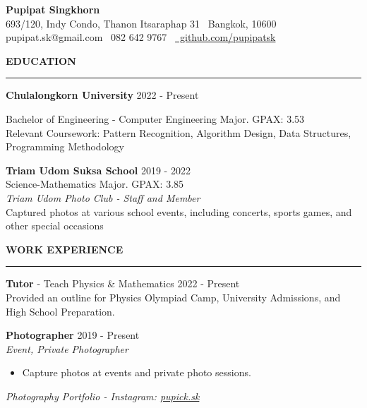 \documentclass[11pt]{article}
\begin{document}
\begin{center}
    {\Large \textbf{Pupipat Singkhorn}}\\
    693/120, Indy Condo, Thanon Itsaraphap 31 \textbullet \ Bangkok, 10600 \\
    pupipat.sk@gmail.com \textbullet \ 082 642 9767 \textbullet\ \href{https://github.com/pupipatsk}{\faGithub\ github.com/pupipatsk}
\end{center}

\textbf{EDUCATION}
\vspace{5pt}
{\color{NavyBlue}\hrule}
\vspace{9pt}
\textbf{Chulalongkorn University} \hfill 2022 - Present

\hspace*{7pt} Bachelor of Engineering - Computer Engineering Major. GPAX: 3.53\\
\hspace*{7pt} Relevant Coursework: Pattern Recognition, Algorithm Design, Data Structures, Programming Methodology

\vspace{6pt}

\textbf{Triam Udom Suksa School} \hfill 2019 - 2022\\
\hspace*{7pt} Science-Mathematics Major. GPAX: 3.85\\
\textit{Triam Udom Photo Club - Staff and Member}\\
\hspace*{7pt} Captured photos at various school events, including concerts, sports games, and other special occasions

\vspace{12pt}

\textbf{WORK EXPERIENCE}
\vspace{5pt}
{\color{NavyBlue}\hrule}
\vspace{9pt}
\textbf{Tutor} - Teach Physics \& Mathematics \hfill 2022 - Present\\
\hspace*{7pt} Provided an outline for Physics Olympiad Camp, University Admissions, and High School Preparation.

\vspace{6pt}

\textbf{Photographer} \hfill 2019 - Present\\
\textit{Event, Private Photographer}
\begin{itemize}[noitemsep, topsep=0pt, partopsep=0pt, parsep=0pt]
    \item Capture photos at events and private photo sessions.
\end{itemize}
\textit{Photography Portfolio - \faInstagram Instagram: \href{https://www.instagram.com/pupick.sk}{pupick.sk}}
\end{document}
